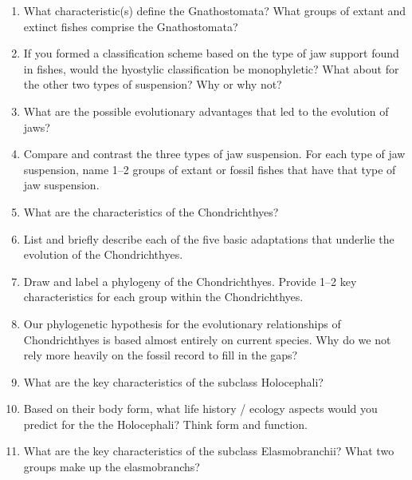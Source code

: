 \documentclass[nofont,letterpaper]{tufte-handout}
\begin{document}
\begin{enumerate}
	\item What characteristic(s) define the Gnathostomata?  What groups of extant and extinct fishes comprise the Gnathostomata?	

	\item If you formed a classification scheme based on the type of jaw support found in fishes, would the hyostylic classification be monophyletic?  What about for the other two types of suspension?  Why or why not?

	\item What are the possible evolutionary advantages that led to the evolution of jaws?

	\item Compare and contrast the three types of jaw suspension.  For each type of jaw suspension, name 1--2 groups of extant or fossil fishes that have that type of jaw suspension.

	\item What are the characteristics of the Chondrichthyes?

	\item List and briefly describe each of the five basic adaptations that underlie the evolution of the Chondrichthyes.

	\item Draw and label a phylogeny of the Chondrichthyes.  Provide 1--2 key characteristics for each group within the Chondrichthyes.

	\item Our phylogenetic hypothesis for the evolutionary relationships of Chondrichthyes is based almost entirely on current species.  Why do we not rely more heavily on the fossil record to fill in the gaps?

	\item What are the key characteristics of the subclass Holocephali?

	\item Based on their body form, what life history / ecology aspects would you predict for the the Holocephali? Think form and function.

	\item What are the key characteristics of the subclass Elasmobranchii?  What two groups make up the elasmobranchs?

\end{enumerate}
\end{document}

